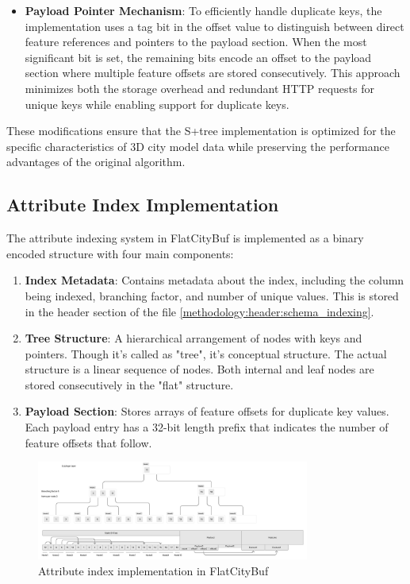 \begin{itemize}
  \item \textbf{Payload Pointer Mechanism}: To efficiently handle duplicate keys, the implementation uses a tag bit in the offset value to distinguish between direct feature references and pointers to the payload section. When the most significant bit is set, the remaining bits encode an offset to the payload section where multiple feature offsets are stored consecutively. This approach minimizes both the storage overhead and redundant HTTP requests for unique keys while enabling support for duplicate keys.

\end{itemize}

These modifications ensure that the S+tree implementation is optimized for the specific characteristics of 3D city model data while preserving the performance advantages of the original algorithm.

\subsection{Attribute Index Implementation}
\label{methodology:attribute_index:implementation}

The attribute indexing system in FlatCityBuf is implemented as a binary encoded structure with four main components:

\begin{enumerate}
  \item \textbf{Index Metadata}: Contains metadata about the index, including the column being indexed, branching factor, and number of unique values. This is stored in the header section of the file \autoref{methodology:header:schema_indexing}.
  \item \textbf{Tree Structure}: A hierarchical arrangement of nodes with keys and pointers. Though it's called as "tree", it's conceptual structure. The actual structure is a linear sequence of nodes. Both internal and leaf nodes are stored consecutively in the "flat" structure.
  \item \textbf{Payload Section}: Stores arrays of feature offsets for duplicate key values. Each payload entry has a 32-bit length prefix that indicates the number of feature offsets that follow.
\end{enumerate}

\begin{figure}[htbp]
  \centering
  \includegraphics[width=0.8\textwidth]{figs/methodology/attribute_index.png}
  \caption{Attribute index implementation in FlatCityBuf}
  \label{fig:methodology:attribute_index}
\end{figure}


